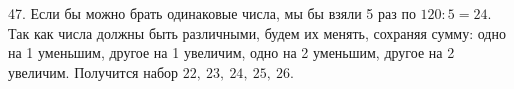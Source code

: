47. Если бы можно брать одинаковые числа, мы бы взяли 5 раз по $120:5=24.$ Так как числа должны быть различными, будем их менять, сохраняя сумму: одно на 1 уменьшим, другое на 1 увеличим, одно на 2 уменьшим, другое на 2 увеличим. Получится набор $22,\ 23,\ 24,\ 25,\ 26.$\\
